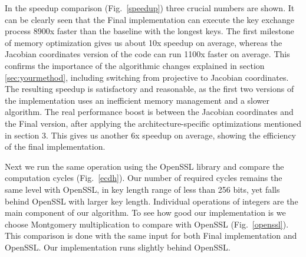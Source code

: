 In the speedup comparison (Fig.~\ref{speedup}) three crucial numbers are shown. It can be clearly seen that the Final implementation can execute the key exchange process 8900x faster than the baseline with the longest keys. The first milestone of memory optimization gives us about 10x speedup on average, whereas the Jacobian coordinates version of the code can run 1100x faster on average. This confirms the importance of the algorithmic changes explained in section \ref{sec:yourmethod}, including switching from projective to Jacobian coordinates. The resulting speedup is satisfactory and reasonable, as the first two versions of the implementation uses an inefficient memory management and a slower algorithm. The real performance boost is between the Jacobian coordinates and the Final version, after applying the architecture-specific optimizations mentioned in section 3. This gives us another 6x speedup on average, showing the efficiency of the final implementation.

Next we run the same operation using the OpenSSL library and compare the computation cycles (Fig.~\ref{ecdh}). Our number of required cycles remains the same level with OpenSSL, in key length range of less than 256 bits, yet falls behind OpenSSL with larger key length. Individual operations of integers are the main component of our algorithm. To see how good our implementation is we choose Montgomery multiplication to compare with OpenSSL (Fig.~\ref{openssl}). This comparison is done with the same input for both Final implementation and OpenSSL. Our implementation runs slightly behind OpenSSL. 

